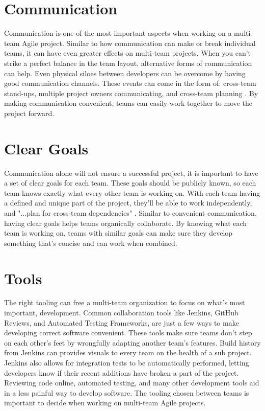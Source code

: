 \documentclass[sigplan,screen]{acmart}
\begin{document}
\section{Communication}
Communication is one of the most important aspects when working on a multi-team Agile project.
Similar to how communication can make or break individual teams, it can have even greater effects on multi-team projects.
When you can't strike a perfect balance in the team layout, alternative forms of communication can help.
Even physical siloes between developers can be overcome by having good communication channels.
These events can come in the form of: cross-team stand-ups, multiple project owners communicating, and cross-team planning \cite{b2}.
By making communication convenient, teams can easily work together to move the project forward.

\section{Clear Goals}
Communication alone will not ensure a successful project, it is important to have a set of clear goals for each team.
These goals should be publicly known, so each team knows exactly what every other team is working on.
With each team having a defined and unique part of the project, they'll be able to work independently, and "...plan for cross-team dependencies" \cite{b2}. 
Similar to convenient communication, having clear goals helps teams organically collaborate.
By knowing what each team is working on, teams with similar goals can make sure they develop something that's concise and can work when combined.


\section{Tools}
The right tooling can free a multi-team organization to focus on what's most important, development.
Common collaboration tools like Jenkins, GitHub Reviews, and Automated Testing Frameworks, are just a few ways to make developing correct software convenient.
These tools make sure teams don't step on each other's feet by wrongfully adapting another team's features.
Build history from Jenkins can provides visuals to every team on the health of a sub project.
Jenkins also allows for integration tests to be automatically performed, letting developers know if their recent additions have broken a part of the project.
Reviewing code online, automated testing, and many other development tools aid in a less painful way to develop software.
The tooling chosen between teams is important to decide when working on multi-team Agile projects.
\end{document}
